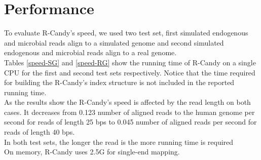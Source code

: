 \documentclass[11pt,a4paper]{report}
\begin{document}





\section{Performance}

To evaluate R-Candy's speed, we used two test set, first simulated endogenous 
and microbial reads align to a simulated genome and second simulated endogenous
and microbial reads align to a real genome.\\

Tables  \ref{speed-SG} and \ref{speed-RG} show the running time of R-Candy on
a single CPU for the first and second test sets respectively.
Notice that the time required for building the R-Candy's index structure is 
not included in the reported running time.\\


As the results  show  the R-Candy's speed is affected by the read length on both cases.
It decreases from 0.123 number of aligned reads to the human genome per second for reads 
of length 25 bps to 0.045 number of aligned reads per second for reads of length 40 bps. \\
In both test sets, the longer the read is the more running time is required\\

On memory, R-Candy uses 2.5G for single-end mapping.\\
\end{document}
